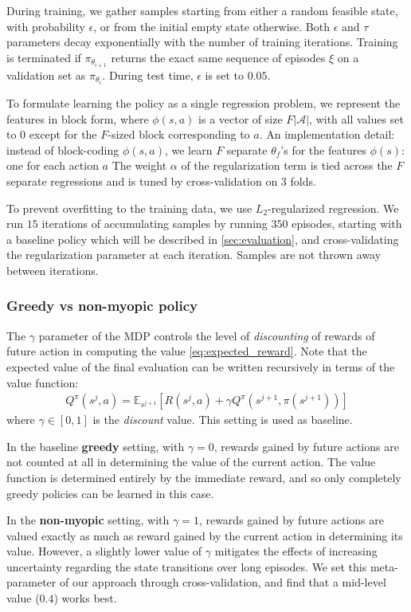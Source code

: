 During training, we gather samples starting from either a random feasible state, with probability $\epsilon$, or from the initial empty state otherwise.
Both $\epsilon$ and $\tau$ parameters decay exponentially with the number of training iterations.
Training is terminated if $\pi_{\theta_{i+1}}$ returns the exact same sequence of episodes $\xi$ on a validation set as $\pi_{\theta_{i}}$.
During test time, $\epsilon$ is set to $0.05$.

To formulate learning the policy as a single regression problem, we represent the features in block form, where $\phi(s,a)$ is a vector of size $F|\mathcal{A}|$, with all values set to $0$ except for the $F$-sized block corresponding to $a$.
An implementation detail: instead of block-coding $\phi(s,a)$, we learn $F$ separate $\theta_f$'s for the features $\phi(s)$: one for each action $a$
The weight $\alpha$ of the regularization term is tied across the $F$ separate regressions and is tuned by cross-validation on 3 folds.

To prevent overfitting to the training data, we use $L_2$-regularized regression.
We run $15$ iterations of accumulating samples by running $350$ episodes, starting with a baseline policy which will be described in \autoref{sec:evaluation}, and cross-validating the regularization parameter at each iteration.
Samples are not thrown away between iterations.

\subsubsection{Greedy vs non-myopic policy}

The $\gamma$ parameter of the MDP controls the level of \emph{discounting} of rewards of future action in computing the value \eqref{eq:expected_reward}.
Note that the expected value of the final evaluation can be written recursively in terms of the value function:
\begin{align} \label{eq:recursive_value}
Q^\pi(s^j,a) = \mathbb{E}_{s^{j+1}} [R(s^j,a) + \gamma Q^\pi(s^{j+1},\pi(s^{j+1}))]
\end{align}
where $\gamma \in [0,1]$ is the \emph{discount} value.
This setting is used as baseline.

In the baseline \textbf{greedy} setting, with $\gamma=0$, rewards gained by future actions are not counted at all in determining the value of the current action.
The value function is determined entirely by the immediate reward, and so only completely greedy policies can be learned in this case.

In the \textbf{non-myopic} setting, with $\gamma=1$, rewards gained by future actions are valued exactly as much as reward gained by the current action in determining its value.
However, a slightly lower value of $\gamma$ mitigates the effects of increasing uncertainty regarding the state transitions over long episodes.
We set this meta-parameter of our approach through cross-validation, and find that a mid-level value ($0.4$) works best.
